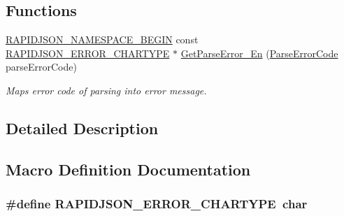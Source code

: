 \subsection*{Functions}
\begin{DoxyCompactItemize}
\item 
\hyperlink{group___r_a_p_i_d_j_s_o_n___c_o_n_f_i_g_gad3806c8251fdc7da9618b7e922674ffc}{R\+A\+P\+I\+D\+J\+S\+O\+N\+\_\+\+N\+A\+M\+E\+S\+P\+A\+C\+E\+\_\+\+B\+E\+G\+IN} const \hyperlink{group___r_a_p_i_d_j_s_o_n___e_r_r_o_r_s_ga7e4636fd48d0148f102b8a13f0539d8c}{R\+A\+P\+I\+D\+J\+S\+O\+N\+\_\+\+E\+R\+R\+O\+R\+\_\+\+C\+H\+A\+R\+T\+Y\+PE} $\ast$ \hyperlink{group___r_a_p_i_d_j_s_o_n___e_r_r_o_r_s_ga755b523205f46c980c80d12e230a3abd}{Get\+Parse\+Error\+\_\+\+En} (\hyperlink{group___r_a_p_i_d_j_s_o_n___e_r_r_o_r_s_ga8d4b32dfc45840bca189ade2bbcb6ba7}{Parse\+Error\+Code} parse\+Error\+Code)
\begin{DoxyCompactList}\small\item\em Maps error code of parsing into error message. \end{DoxyCompactList}\end{DoxyCompactItemize}


\subsection{Detailed Description}


\subsection{Macro Definition Documentation}
\subsubsection[{\texorpdfstring{R\+A\+P\+I\+D\+J\+S\+O\+N\+\_\+\+E\+R\+R\+O\+R\+\_\+\+C\+H\+A\+R\+T\+Y\+PE}{RAPIDJSON_ERROR_CHARTYPE}}]{\setlength{\rightskip}{0pt plus 5cm}\#define R\+A\+P\+I\+D\+J\+S\+O\+N\+\_\+\+E\+R\+R\+O\+R\+\_\+\+C\+H\+A\+R\+T\+Y\+PE~char}\hypertarget{group___r_a_p_i_d_j_s_o_n___e_r_r_o_r_s_ga7e4636fd48d0148f102b8a13f0539d8c}{}\label{group___r_a_p_i_d_j_s_o_n___e_r_r_o_r_s_ga7e4636fd48d0148f102b8a13f0539d8c}


